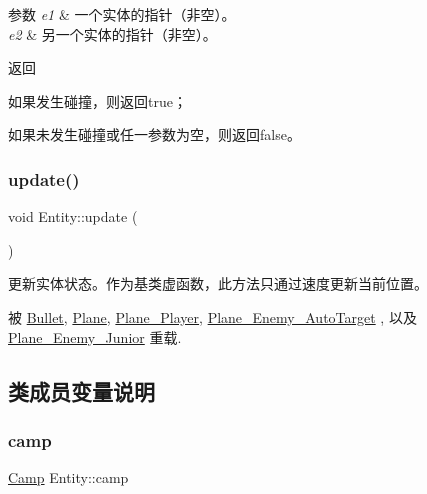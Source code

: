 \begin{DoxyParams}{参数}
{\em e1} & 一个实体的指针（非空）。\\
\hline
{\em e2} & 另一个实体的指针（非空）。 \\
\hline
\end{DoxyParams}
\begin{DoxyReturn}{返回}

\begin{DoxyItemize}
\item 如果发生碰撞，则返回true；
\item 如果未发生碰撞或任一参数为空，则返回false。 
\end{DoxyItemize}
\end{DoxyReturn}
\mbox{\label{class_entity_a00b6eeaf99b35c8f8b10b5fbfc1baf4f}} 
\subsubsection{\texorpdfstring{update()}{update()}}
{\footnotesize\ttfamily void Entity\+::update (\begin{DoxyParamCaption}{ }\end{DoxyParamCaption})\hspace{0.3cm}{\ttfamily [virtual]}}



更新实体状态。作为基类虚函数，此方法只通过速度更新当前位置。 



被 \hyperlink{class_bullet_a32f4a0611fe2dd245fee955d14ca1f68}{Bullet}, \hyperlink{class_plane_a7fbb07f76503fe057772e01f542afc32}{Plane}, \hyperlink{class_plane___player_ae68c08ce11fad9fd164c00eb4db6b348}{Plane\+\_\+\+Player}, \hyperlink{class_plane___enemy___auto_target_a79e6eda540d282205ce6151ae0b304ca}{Plane\+\_\+\+Enemy\+\_\+\+Auto\+Target} , 以及 \hyperlink{class_plane___enemy___junior_a262143737ed740f65063dbcbc5970f55}{Plane\+\_\+\+Enemy\+\_\+\+Junior} 重载.



\subsection{类成员变量说明}
\mbox{\label{class_entity_a5326accd49d3817310ec90692b9da3df}} 
\subsubsection{\texorpdfstring{camp}{camp}}
{\footnotesize\ttfamily \hyperlink{_entity_8h_ad54c4fe39f1c51b786c24ae0b7763b44}{Camp} Entity\+::camp\hspace{0.3cm}{\ttfamily [protected]}}



